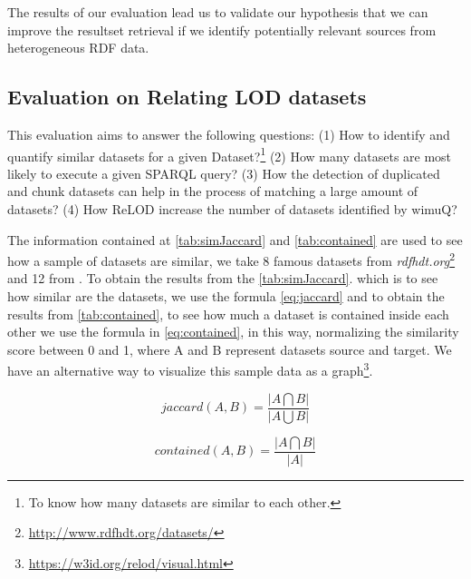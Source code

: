 \documentclass[sw]{iosart2x}
\begin{document}
The results of our evaluation lead us to validate our hypothesis that we can improve the resultset retrieval if we identify potentially relevant sources from heterogeneous RDF data.

\subsection{Evaluation on Relating LOD datasets} \label{sec:relod_eval}
This evaluation aims to answer the following questions: (1) How to identify and quantify similar datasets for a given Dataset?\footnote{To know how many datasets are similar to each other.} (2) How many datasets are most likely to execute a given SPARQL query? (3) How the detection of duplicated and chunk datasets can help in the process of matching a large amount of datasets? (4) How ReLOD increase the number of datasets identified by wimuQ?


The information contained at \cref{tab:simJaccard} and \cref{tab:contained} are used to see how a sample of datasets are similar, we take 8 famous datasets from \textit{rdfhdt.org}\footnote{\url{http://www.rdfhdt.org/datasets/}} and 12 from \cite{10.1145/3308560.3317075}. To obtain the results from the \cref{tab:simJaccard}. which is to see how similar are the datasets, we use the formula \cref{eq:jaccard} and to obtain the results from \cref{tab:contained}, to see how much a dataset is contained inside each other we use the formula in \cref{eq:contained}, in this way, normalizing the similarity score between 0 and 1, where A and B represent datasets source and target. We have an alternative way to visualize this sample data as a graph\footnote{\url{https://w3id.org/relod/visual.html}}.

\begin{equation} \label{eq:jaccard}
    jaccard(A, B) = \frac{|A \bigcap B|}{ |A\bigcup B|}
\end{equation}

\begin{equation}\label{eq:contained}
    contained(A, B) = \frac{|A \bigcap B|}{|A|}
\end{equation}
\end{document}
